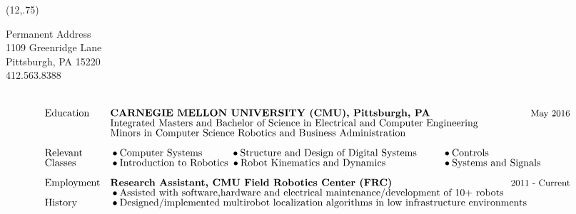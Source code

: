 \documentclass[]{article}
\newcommand{\subpoint}[1]{\bullet \text{\fontsize{10pt}{12pt}\selectfont #1}}
\newcommand{\Date}[1]{ \text{\fontsize{9pt}{12pt}\selectfont #1}}
\begin{document}
\begin{textblock}{3}(12,.75)
\begin{center}
\scriptsize
Permanent Address\\
1109 Greenridge Lane\\
Pittsburgh, PA 15220\\
412.563.8388\\
\end{center}
\end{textblock}
\begin{align*}
&\\
%
%
&\text{Education} && \textbf{CARNEGIE MELLON UNIVERSITY (CMU), Pittsburgh, PA} &&
 \hspace{-.7cm} \Date{May 2016}\\[-.5em]
& && \text{Integrated Masters and Bachelor of Science in Electrical and Computer Engineering} && 
\hspace{-1.3 cm} \\[-.5em]
& && \text{Minors in Computer Science Robotics and$  $ Business Administration}\\[.5em]
%
%
&\text{Relevant} && \subpoint{Computer Systems}
 \hspace{1cm}\subpoint{Structure and Design of Digital Systems}
 \hspace{.9cm} \subpoint{Controls} 
 && 
 \\[-.5em]
 & \text{Classes}&& \subpoint{Introduction to Robotics} 
  \hspace{.1cm} \subpoint{Robot Kinematics and Dynamics} 
   \hspace{2cm}  \subpoint{Systems and Signals}  \\[.5em]
&\text{Employment} && \textbf{Research Assistant, CMU Field Robotics Center (FRC)} && \hspace{-1.4cm} \Date{2011 - Current}\\[-.5em]
& && \subpoint{ Assisted with software,hardware and electrical maintenance/development of 10+ robots}\\[-.5em]
&\text{History} &&  \subpoint{ Designed/implemented multirobot localization algorithms in low infrastructure environments }\\[-.5em]

\end{align*}
\end{document}
